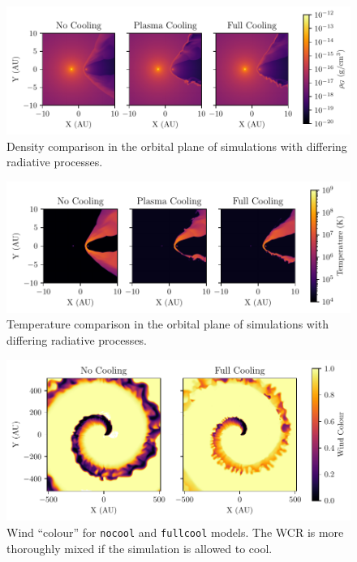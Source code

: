 \documentclass[fleqn,usenatbib]{mnras}
\begin{document}
\begin{figure}
  \centering
  \includegraphics{assets/results/radiative/radiative-crop-2-rho.pdf}
  \caption[Density comparison of simulations with differing radiative processes]{Density comparison  in the orbital plane of simulations with differing radiative processes.}
  \label{fig:postshockcompression}
\end{figure}

\begin{figure}
  \centering
  \includegraphics{assets/results/radiative/radiative-crop-2-temp.pdf}
  \caption[Temperature comparison of simulations with differing radiative processes]{Temperature comparison in the orbital plane of simulations with differing radiative processes.}
  \label{fig:postshocktemperature}
\end{figure}

\begin{figure}
  \centering
  \includegraphics[width=\linewidth]{assets/results/radiative/radiative-r0.pdf}
  \caption[Wind mixing due to radiative methods]{Wind ``colour'' for \texttt{nocool} and \texttt{fullcool} models. The WCR is more thoroughly mixed if the simulation is allowed to cool.}
  \label{fig:radiative-windmixing}
\end{figure}
\end{document}
